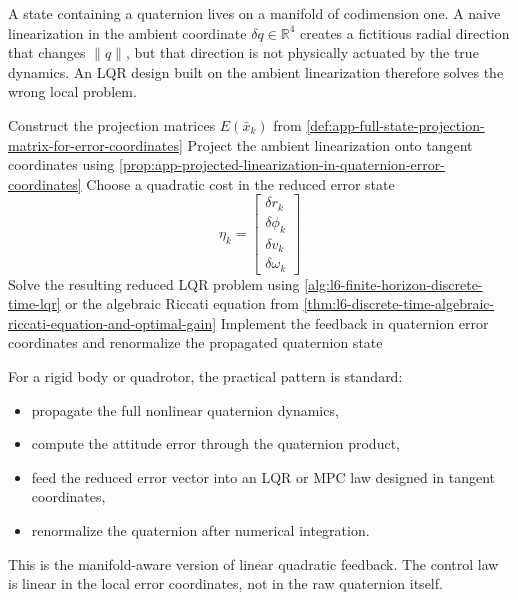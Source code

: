 \begin{remark}
	A state containing a quaternion lives on a manifold of codimension one. A naive linearization in the ambient coordinate $\delta q \in \mathbb{R}^{4}$ creates a fictitious radial direction that changes $\|q\|$, but that direction is not physically actuated by the true dynamics. An LQR design built on the ambient linearization therefore solves the wrong local problem.
\end{remark}

\begin{algorithm}[H]
	\DontPrintSemicolon
	\caption{Quaternion Error-State LQR Design}
\label{alg:app-quaternion-error-state-lqr-design}
	Construct the projection matrices $E(\bar x_k)$ from \autoref{def:app-full-state-projection-matrix-for-error-coordinates}\;
	Project the ambient linearization onto tangent coordinates using \autoref{prop:app-projected-linearization-in-quaternion-error-coordinates}\;
	Choose a quadratic cost in the reduced error state
	\[
		\eta_k=
		\begin{bmatrix}
			\delta r_k \\
			\delta \phi_k \\
			\delta v_k \\
			\delta \omega_k
		\end{bmatrix}
	\]\;
	Solve the resulting reduced LQR problem using \autoref{alg:l6-finite-horizon-discrete-time-lqr} or the algebraic Riccati equation from \autoref{thm:l6-discrete-time-algebraic-riccati-equation-and-optimal-gain}\;
	Implement the feedback in quaternion error coordinates and renormalize the propagated quaternion state\;
\end{algorithm}

\begin{remark}
	For a rigid body or quadrotor, the practical pattern is standard:
	\begin{itemize}
		\item propagate the full nonlinear quaternion dynamics,
		\item compute the attitude error through the quaternion product,
		\item feed the reduced error vector into an LQR or MPC law designed in tangent coordinates,
		\item renormalize the quaternion after numerical integration.
	\end{itemize}
	This is the manifold-aware version of linear quadratic feedback. The control law is linear in the local error coordinates, not in the raw quaternion itself.
\end{remark}
